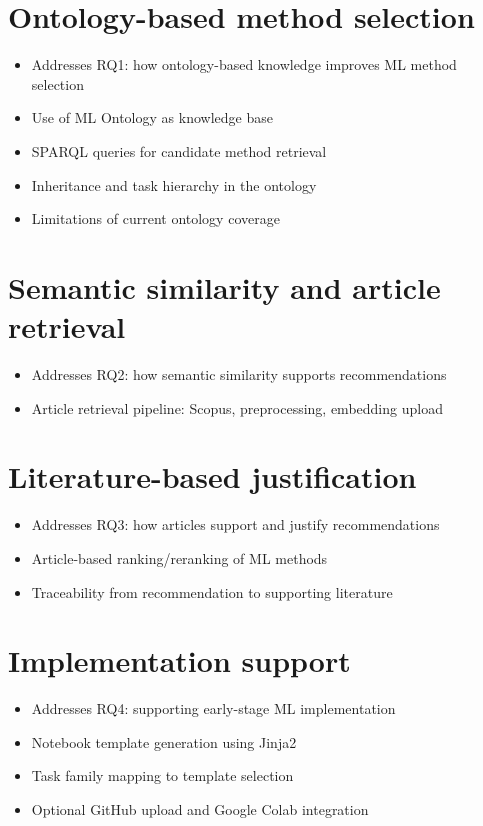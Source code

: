 \label{ch:research-approach}

\section{Ontology-based method selection}

\begin{itemize}
    \item Addresses RQ1: how ontology-based knowledge improves ML method selection
    \item Use of ML Ontology as knowledge base
    \item SPARQL queries for candidate method retrieval
    \item Inheritance and task hierarchy in the ontology
    \item Limitations of current ontology coverage
\end{itemize}

\section{Semantic similarity and article retrieval}

\begin{itemize}
    \item Addresses RQ2: how semantic similarity supports recommendations
    \item Article retrieval pipeline: Scopus, preprocessing, embedding upload
\end{itemize}

\section{Literature-based justification}

\begin{itemize}
    \item Addresses RQ3: how articles support and justify recommendations
    \item Article-based ranking/reranking of ML methods
    \item Traceability from recommendation to supporting literature
\end{itemize}

\section{Implementation support}

\begin{itemize}
    \item Addresses RQ4: supporting early-stage ML implementation
    \item Notebook template generation using Jinja2
    \item Task family mapping to template selection
    \item Optional GitHub upload and Google Colab integration
\end{itemize}

